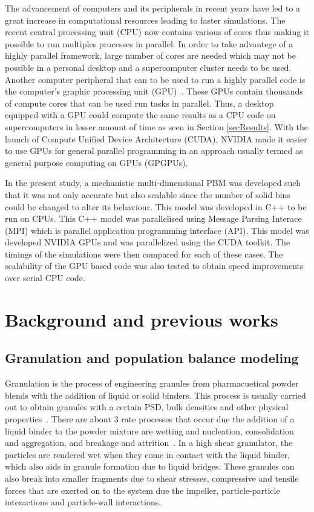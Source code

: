 \documentclass[preprint,10pt,authoryear]{elsarticle}
\begin{document}
\begin{linenumbers}
The advancement of computers and its peripherals in recent years have led to a great increase in 
computational resources leading to faster simulations. The recent central processing unit (CPU) 
now contains various of cores thus making it possible to run multiples processes in parallel. 
In order to take advantege of a highly parallel framework, large number of cores are needed 
which may not be possible in a personal desktop and a supercomputer cluster needs to be used.
Another computer peripheral that can to be used to run a highly parallel code is the computer's 
graphic processing unit (GPU)~\citep{Prakash2013b}. These GPUs contain thousands of compute 
cores that can be used run tasks in parallel. Thus, a desktop equipped with a GPU could 
compute the same results as a CPU code on supercomputers in lesser amount of time as seen in Section \ref{secResults}.
With the launch of Compute Unified Device Architecture (CUDA), NVIDIA made it easier to use GPUs for 
general parallel programming in an approach usually termed as general purpose computing on GPUs (GPGPUs).

In the present study, a mechanistic multi-dimensional PBM was developed such that it was not 
only accurate but also scalable since the number of solid bins could be changed to alter its 
behaviour. This model was developed in C++ to be run on CPUs. This C++ model was parallelised 
using Message Parsing Interace (MPI) which is parallel application programming interface (API). 
This model was developed NVIDIA GPUs and was parallelized using the CUDA toolkit. The timings of 
the simulations were then compared for each of these cases. The scalability of the GPU based code 
was also tested to obtain speed improvements over serial CPU code.


\section{Background and previous works}
\label{secBkgd}
\subsection{Granulation and population balance modeling}
Granulation is the process of engineering granules from pharmacuetical powder blends 
with the addition of liquid or solid binders. This process is usually carried out 
to obtain granules with a certain PSD,  bulk densities and other physical properties~\citep{Barrasso2015cerd}.
There are about 3 rate processes that occur due the addition of a liquid binder to the 
powder mixture are wetting and nucleation, consolidation and aggregation, and breakage 
and attrition~\citep{sen2014}. In a high shear granulator, the particles are rendered wet 
when they come in contact with the liquid binder, which also aids in granule formation due to 
liquid bridges. These granules can also break into smaller fragments due to shear stresses, 
compressive and tensile forces that are exerted on to the system due the impeller, 
particle-particle interactions and particle-wall interactions.


\end{linenumbers}
\end{document}
